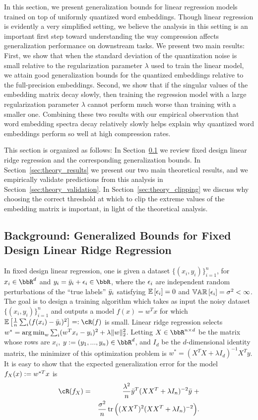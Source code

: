 In this section, we present generalization bounds for linear regression models trained on top of uniformly quantized word embeddings.
Though linear regression is evidently a very simplified setting, we believe the analysis in this setting is an important first step toward understanding the way compression affects generalization performance on downstream tasks.
We present two main results:
First, we show that when the standard deviation of the quantization noise is small relative to the regularization parameter $\lambda$ used to train the linear model, we attain good generalization bounds for the quantized embeddings relative to the full-precision embeddings.
Second, we show that if the singular values of the embedding matrix decay slowly, then training the regression model with a large regularization parameter $\lambda$ cannot perform much worse than training with a smaller one.
Combining these two results with our empirical observation that word embedding spectra decay relatively slowly helps explain why quantized word embeddings perform so well at high compression rates.

This section is organized as follows:
In Section~\ref{sec:theory_background} we review fixed design linear ridge regression and the corresponding generalization bounds.
In Section~\ref{sec:theory_results} we present our two main theoretical results, and we empirically validate predictions from this analysis in Section~\ref{sec:theory_validation}.
In Section~\ref{sec:theory_clipping} we discuss why choosing the correct threshold at which to clip the extreme values of the embedding matrix is important, in light of the theoretical analysis.

\subsection{Background: Generalized Bounds for Fixed Design Linear Ridge Regression}
\label{sec:theory_background}
In fixed design linear regression, one is given a dataset $\{(x_i,y_i)\}_{i=1}^n$, for $x_i \in \RR^d$ and $y_i = \by_i + \eps_i \in \RR$, where the $\eps_i$ are independent random perturbations of the ``true labels'' $\by_i$ satisfying $\expect{}{\eps_i} = 0$ and $\var{}{\eps_i} = \sigma^2 < \infty$.
The goal is to design a training algorithm which takes as input the noisy dataset $\{(x_i,y_i)\}_{i=1}^n$ and outputs a model $f(x) = w^T x$ for which $\expect{}{\frac{1}{n}\sum_i (f(x_i) -\by_i)^2} \eqdef \cR(f)$ is small.
Linear ridge regression selects $w^* = \argmin_w \sum_i (w^T x_i - y_i)^2 + \lambda\|w\|_2^2$.
Letting $X \in \RR^{n\times d}$ be the matrix whose rows are $x_i$, $y \defeq (y_1,...,y_n) \in \RR^d$, and $I_d$ be the $d$-dimensional identity matrix, the minimizer of this optimization problem is $w^* = ( X^T X + \lambda I_d)^{-1}X^Ty$.
It is easy to show \citep{alaoui15} that the expected generalization error for the model $f_X(x) \defeq w^{*T}x$ is
\begin{eqnarray*}
\cR(f_X) &=& \frac{\lambda^2}{n} \by^T(XX^T + \lambda I_n)^{-2}\by \; +\\ && \frac{\sigma^2}{n}\tr\Big((XX^T)^2(XX^T + \lambda I_n)^{-2}\Big).
\end{eqnarray*}

